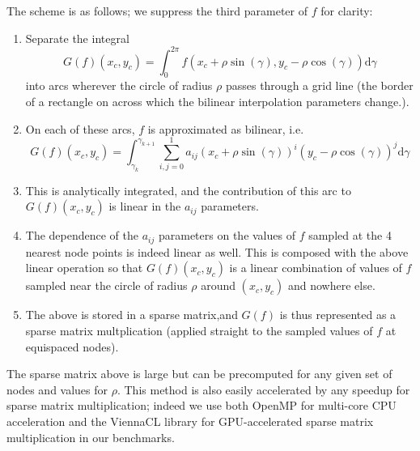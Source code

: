 \documentclass{article}
\theoremstyle{theorem}
\theoremstyle{definition}
\begin{document}
The scheme is as follows; we suppress the third parameter of $f$ for clarity:
\begin{enumerate}
	\item Separate the integral
	\[ G(f)(x_c,y_c) = \int_0^{2\pi}  f(x_c + \rho \sin(\gamma), y_c - \rho \cos(\gamma))  \mathrm{d} \gamma\]
	into arcs wherever the circle of radius $\rho$ passes through a grid line (the border of a rectangle on across which the bilinear interpolation parameters change.).  
	\item On each of these arcs, $f$ is approximated as bilinear, i.e. 
	\[ G(f)(x_c,y_c) = \int_{\gamma_k}^{\gamma_{k+1}} \sum_{i,j=0}^{1} a_{ij} (x_c + \rho \sin(\gamma))^i (y_c - \rho \cos(\gamma))^j  \mathrm{d} \gamma\]
		\item This is analytically integrated, and the contribution of this arc to $G(f)(x_c,y_c)$ is linear in the $a_{ij}$ parameters.
	\item The dependence of the $a_{ij}$ parameters on the values of $f$ sampled at the 4 nearest node points is indeed linear as well.  This is composed with the above linear operation so that $G(f)(x_c,y_c)$ is a linear combination of values of $f$ sampled near the circle of radius $\rho$ around $(x_c,y_c)$ and nowhere else.
	\item  The above is stored in a sparse matrix,and $G(f)$ is thus represented as a sparse matrix multplication (applied straight to the sampled values of $f$ at equispaced nodes).
\end{enumerate}  
The sparse matrix above is large but can be precomputed for any given set of nodes and values for $\rho$.  This method is also easily accelerated by any speedup for sparse matrix multiplication; indeed we use both OpenMP for multi-core CPU acceleration and the ViennaCL library for GPU-accelerated sparse matrix multiplication in our benchmarks.
\end{document}
